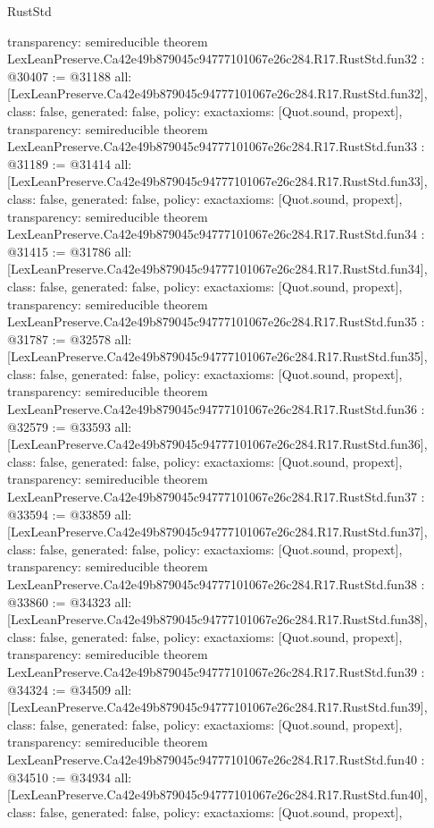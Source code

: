 \begin{lexlean}{RustStd}
\begin{coremodule}
{  transparency: semireducible
}
theorem LexLeanPreserve.Ca42e49b879045c94777101067e26c284.R17.RustStd.fun32 : @30407 := @31188 {
  all: [LexLeanPreserve.Ca42e49b879045c94777101067e26c284.R17.RustStd.fun32],
  class: false,
  generated: false,
  policy: exact{axioms: [Quot.sound, propext]},
  transparency: semireducible
}
theorem LexLeanPreserve.Ca42e49b879045c94777101067e26c284.R17.RustStd.fun33 : @31189 := @31414 {
  all: [LexLeanPreserve.Ca42e49b879045c94777101067e26c284.R17.RustStd.fun33],
  class: false,
  generated: false,
  policy: exact{axioms: [Quot.sound, propext]},
  transparency: semireducible
}
theorem LexLeanPreserve.Ca42e49b879045c94777101067e26c284.R17.RustStd.fun34 : @31415 := @31786 {
  all: [LexLeanPreserve.Ca42e49b879045c94777101067e26c284.R17.RustStd.fun34],
  class: false,
  generated: false,
  policy: exact{axioms: [Quot.sound, propext]},
  transparency: semireducible
}
theorem LexLeanPreserve.Ca42e49b879045c94777101067e26c284.R17.RustStd.fun35 : @31787 := @32578 {
  all: [LexLeanPreserve.Ca42e49b879045c94777101067e26c284.R17.RustStd.fun35],
  class: false,
  generated: false,
  policy: exact{axioms: [Quot.sound, propext]},
  transparency: semireducible
}
theorem LexLeanPreserve.Ca42e49b879045c94777101067e26c284.R17.RustStd.fun36 : @32579 := @33593 {
  all: [LexLeanPreserve.Ca42e49b879045c94777101067e26c284.R17.RustStd.fun36],
  class: false,
  generated: false,
  policy: exact{axioms: [Quot.sound, propext]},
  transparency: semireducible
}
theorem LexLeanPreserve.Ca42e49b879045c94777101067e26c284.R17.RustStd.fun37 : @33594 := @33859 {
  all: [LexLeanPreserve.Ca42e49b879045c94777101067e26c284.R17.RustStd.fun37],
  class: false,
  generated: false,
  policy: exact{axioms: [Quot.sound, propext]},
  transparency: semireducible
}
theorem LexLeanPreserve.Ca42e49b879045c94777101067e26c284.R17.RustStd.fun38 : @33860 := @34323 {
  all: [LexLeanPreserve.Ca42e49b879045c94777101067e26c284.R17.RustStd.fun38],
  class: false,
  generated: false,
  policy: exact{axioms: [Quot.sound, propext]},
  transparency: semireducible
}
theorem LexLeanPreserve.Ca42e49b879045c94777101067e26c284.R17.RustStd.fun39 : @34324 := @34509 {
  all: [LexLeanPreserve.Ca42e49b879045c94777101067e26c284.R17.RustStd.fun39],
  class: false,
  generated: false,
  policy: exact{axioms: [Quot.sound, propext]},
  transparency: semireducible
}
theorem LexLeanPreserve.Ca42e49b879045c94777101067e26c284.R17.RustStd.fun40 : @34510 := @34934 {
  all: [LexLeanPreserve.Ca42e49b879045c94777101067e26c284.R17.RustStd.fun40],
  class: false,
  generated: false,
  policy: exact{axioms: [Quot.sound, propext]},
}
\end{coremodule}
\end{lexlean}
